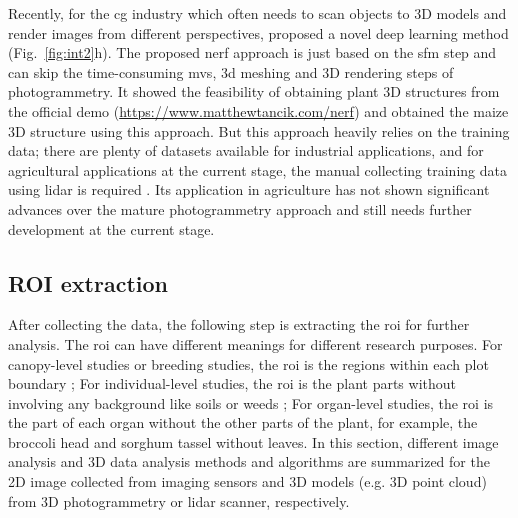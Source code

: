

Recently, for the \gls{cg} industry which often needs to scan objects to 3D models and render images from different perspectives, \citet{mildenhall_nerf_2022} proposed a novel deep learning method (Fig.~\ref{fig:int2}h). The proposed \gls{nerf} approach is just based on the \gls{sfm} step and can skip the time-consuming \gls{mvs}, 3d meshing and 3D rendering steps of photogrammetry. It showed the feasibility of obtaining plant 3D structures from the official demo (\url{https://www.matthewtancik.com/nerf}) and \citet{jignasu_plant_2023} obtained the maize 3D structure using this approach. But this approach heavily relies on the training data; there are plenty of datasets available for industrial applications, and for agricultural applications at the current stage, the manual collecting training data using \gls{lidar} is required \citep{jignasu_plant_2023}. Its application in agriculture has not shown significant advances over the mature photogrammetry approach and still needs further development at the current stage.



\subsection{ROI extraction}

After collecting the data, the following step is extracting the \acrfull{roi} for further analysis. The \gls{roi} can have different meanings for different research purposes. For canopy-level studies or breeding studies, the \gls{roi} is the regions within each plot boundary \citep{trevisan_htp_2020, han_drone_2021}; For individual-level studies, the \gls{roi} is the plant parts without involving any background like soils or weeds \citep{ge_method_2019,guo_fieldbased_2020}; For organ-level studies, the \gls{roi} is the part of each organ without the other parts of the plant, for example, the broccoli head \citep{zhou_monitoring_2020} and sorghum tassel \citep{ghosal_weakly_2019} without leaves. In this section, different image analysis and 3D data analysis methods and algorithms are summarized for the 2D image collected from imaging sensors and 3D models (e.g. 3D point cloud) from 3D photogrammetry or \gls{lidar} scanner, respectively.


